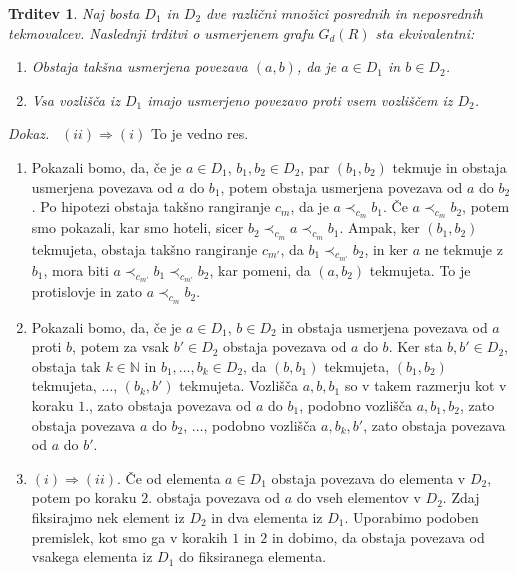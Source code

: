 \documentclass[a4paper, 12pt]{book}
\newtheorem{trditev}{Trditev}[chapter]
\newenvironment{dokaz}{\emph{Dokaz.}\ }{\hspace{\fill}{$\Box$}}
\begin{document}
\begin{trditev}
\label{trditev_ekvivalenc_mnozic_posrednih_tekmovalcev}
    Naj bosta $D_1$ in $D_2$ dve različni množici posrednih in neposrednih tekmovalcev. Naslednji trditvi o usmerjenem grafu $G_d(R)$ sta ekvivalentni:
    \begin{enumerate}[label=(\roman*)]
        \item Obstaja takšna usmerjena povezava $(a, b)$, da je $a \in D_1$ in $b \in D_2$.
        \item Vsa vozlišča iz $D_1$ imajo usmerjeno povezavo proti vsem vozliščem iz $D_2$.
    \end{enumerate}
\end{trditev}
\begin{dokaz}
    $(ii) \Rightarrow (i)$ To je vedno res.

    \begin{enumerate}
        \item Pokazali bomo, da, če je $a \in D_1$, $b_1, b_2 \in D_2$, par $(b_1, b_2)$ tekmuje in obstaja usmerjena povezava od $a$ do $b_1$, potem obstaja usmerjena povezava od $a$ do $b_2$. Po hipotezi obstaja takšno rangiranje $c_m$, da je $a \prec_{c_m} b_1$. Če $a \prec_{c_m} b_2$, potem smo pokazali, kar smo hoteli, sicer $b_2 \prec_{c_m} a \prec_{c_m} b_1$. Ampak, ker $(b_1, b_2)$ tekmujeta, obstaja takšno rangiranje $c_{m'}$, da $b_1 \prec_{c_{m'}} b_2$, in ker $a$ ne tekmuje z $b_1$, mora biti $a \prec_{c_{m'}} b_1 \prec_{c_{m'}} b_2$, kar pomeni, da $(a, b_2)$ tekmujeta. To je protislovje in zato $a \prec_{c_m} b_2$.
        \item Pokazali bomo, da, če je $a \in D_1$, $b \in D_2$ in obstaja usmerjena povezava od $a$ proti $b$, potem za vsak $b' \in D_2$ obstaja povezava od $a$ do $b$. Ker sta $b, b' \in D_2$, obstaja tak $k \in \mathbb{N}$ in $b_1, \dots, b_k \in D_2$, da $(b, b_1)$ tekmujeta, $(b_1, b_2)$ tekmujeta, $\dots$, $(b_k, b')$ tekmujeta. Vozlišča $a, b, b_1$ so v takem razmerju kot v koraku $1.$, zato obstaja povezava od $a$ do $b_1$, podobno vozlišča $a, b_1, b_2$, zato obstaja povezava $a$ do $b_2$, $\dots$, podobno vozlišča $a, b_k, b'$, zato obstaja povezava od $a$ do $b'$.
        \item $(i) \Rightarrow (ii)$. Če od elementa $a \in D_1$ obstaja povezava do elementa v $D_2$, potem po koraku $2.$ obstaja povezava od $a$ do vseh elementov v $D_2$. Zdaj fiksirajmo nek element iz $D_2$ in dva elementa iz $D_1$. Uporabimo podoben premislek, kot smo ga v korakih $1$ in $2$ in dobimo, da obstaja povezava od vsakega elementa iz $D_1$ do fiksiranega elementa.
    \end{enumerate}
\end{dokaz}
\end{document}
